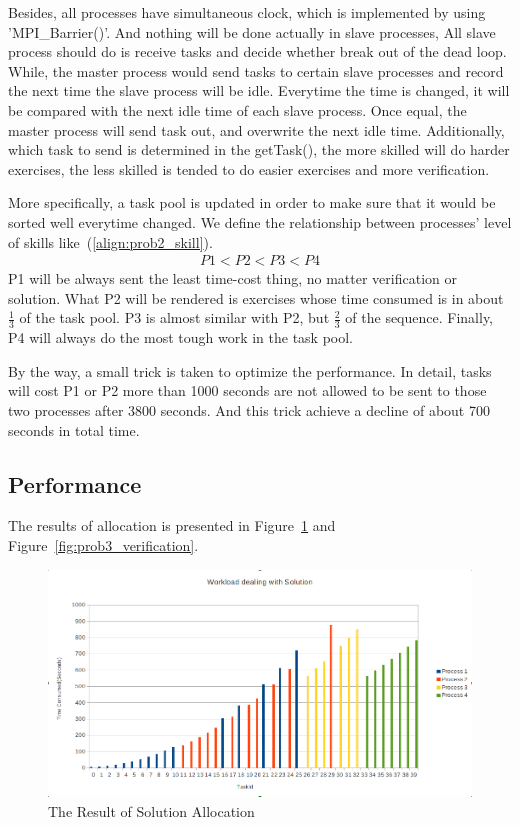 \documentclass[a4paper]{article}   %
\begin{document}
\begin{CJK}{UTF8}{gbsn}
\begin{spacing}{1.2}
Besides, all processes have simultaneous clock, which is implemented by using 'MPI\_Barrier()'. And nothing will be done actually in slave processes, All slave process should do is receive tasks and decide whether break out of the dead loop. While, the master process would send tasks to certain slave processes and record the next time the slave process will be idle. Everytime the time is changed, it will be compared with the next idle time of each slave process. Once equal, the master process will send task out, and overwrite the next idle time. Additionally, which task to send is determined in the getTask(), the more skilled will do harder exercises, the less skilled is tended to do easier exercises and more verification. 

More specifically, a task pool is updated in order to make sure that it would be sorted well everytime changed. We define the relationship between processes' level of skills like~(\ref{align:prob2_skill}).
\begin{align}\label{align:prob2_skill}
P1 < P2 < P3 < P4
\end{align}
P1 will be always sent the least time-cost thing, no matter verification or solution. What P2 will be rendered is exercises whose time consumed is in about $\frac{1}{3}$ of the task pool. P3 is almost similar with P2, but $\frac{2}{3}$ of the sequence. Finally, P4 will always do the most tough work in the task pool.

By the way, a small trick is taken to optimize the performance. In detail, tasks will cost P1 or P2 more than 1000 seconds are not allowed to be sent to those two processes after 3800 seconds. And this trick achieve a decline of about 700 seconds in total time. 
\subsection{Performance}
The results of allocation is presented in Figure~\ref{fig:prob3_solution} and Figure~\ref{fig:prob3_verification}. 
\begin{figure}[htbp]
\centering
\includegraphics[width=12cm]{figs/prob3_SolutionDistribution.png}
\caption{The Result of Solution Allocation}
\label{fig:prob3_solution}
\end{figure}


\end{spacing}
\end{CJK}
\end{document}
